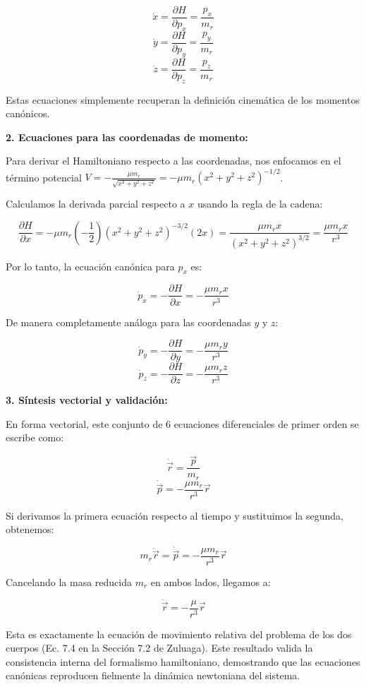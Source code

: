 \documentclass[a4paper]{article}
\begin{document}
$$\dot{x} = \frac{\partial H}{\partial p_x} = \frac{p_x}{m_r}$$
$$\dot{y} = \frac{\partial H}{\partial p_y} = \frac{p_y}{m_r}$$
$$\dot{z} = \frac{\partial H}{\partial p_z} = \frac{p_z}{m_r}$$

Estas ecuaciones simplemente recuperan la definición cinemática de los momentos canónicos.

\textbf{2. Ecuaciones para las coordenadas de momento:}

Para derivar el Hamiltoniano respecto a las coordenadas, nos enfocamos en el término potencial $V = -\frac{\mu m_r}{\sqrt{x^2 + y^2 + z^2}} = -\mu m_r (x^2 + y^2 + z^2)^{-1/2}$. 

Calculamos la derivada parcial respecto a $x$ usando la regla de la cadena:

$$\frac{\partial H}{\partial x} = -\mu m_r \left( -\frac{1}{2} \right) (x^2 + y^2 + z^2)^{-3/2} (2x) = \frac{\mu m_r x}{(x^2 + y^2 + z^2)^{3/2}} = \frac{\mu m_r x}{r^3}$$

Por lo tanto, la ecuación canónica para $p_x$ es:

$$\dot{p}_x = -\frac{\partial H}{\partial x} = -\frac{\mu m_r x}{r^3}$$

De manera completamente análoga para las coordenadas $y$ y $z$:

$$\dot{p}_y = -\frac{\partial H}{\partial y} = -\frac{\mu m_r y}{r^3}$$
$$\dot{p}_z = -\frac{\partial H}{\partial z} = -\frac{\mu m_r z}{r^3}$$

\textbf{3. Síntesis vectorial y validación:}

En forma vectorial, este conjunto de 6 ecuaciones diferenciales de primer orden se escribe como:

$$\dot{\vec{r}} = \frac{\vec{p}}{m_r}$$
$$\dot{\vec{p}} = -\frac{\mu m_r}{r^3} \vec{r}$$

Si derivamos la primera ecuación respecto al tiempo y sustituimos la segunda, obtenemos:

$$m_r \ddot{\vec{r}} = \dot{\vec{p}} = -\frac{\mu m_r}{r^3} \vec{r}$$

Cancelando la masa reducida $m_r$ en ambos lados, llegamos a:

$$\ddot{\vec{r}} = -\frac{\mu}{r^3} \vec{r}$$

Esta es exactamente la ecuación de movimiento relativa del problema de los dos cuerpos (Ec. 7.4 en la Sección 7.2 de Zuluaga). Este resultado valida la consistencia interna del formalismo hamiltoniano, demostrando que las ecuaciones canónicas reproducen fielmente la dinámica newtoniana del sistema.
\end{document}

